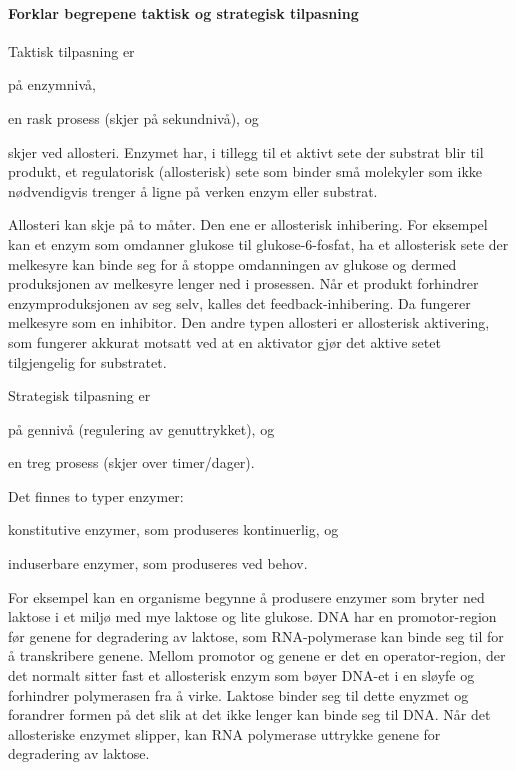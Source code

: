 \paragraph{Forklar begrepene taktisk og strategisk tilpasning} Taktisk tilpasning er 
\begin{inparaenum}[(i)]
	\item på enzymnivå,
	\item en rask prosess (skjer på sekundnivå), og
	\item skjer ved allosteri. Enzymet har, i tillegg til et aktivt sete der substrat blir til produkt, et regulatorisk (allosterisk) sete som binder små molekyler som ikke nødvendigvis trenger å ligne på verken enzym eller substrat.
\end{inparaenum}
Allosteri kan skje på to måter. Den ene er allosterisk inhibering. For eksempel kan et enzym som omdanner glukose til glukose-6-fosfat, ha et allosterisk sete der melkesyre kan binde seg for å stoppe omdanningen av glukose og dermed produksjonen av melkesyre lenger ned i prosessen. Når et produkt forhindrer enzymproduksjonen av seg selv, kalles det feedback-inhibering. Da fungerer melkesyre som en inhibitor. Den andre typen allosteri er allosterisk aktivering, som fungerer akkurat motsatt ved at en aktivator gjør det aktive setet tilgjengelig for substratet.

Strategisk tilpasning er
\begin{inparaenum}[(i)]
	\item på gennivå (regulering av genuttrykket), og
	\item en treg prosess (skjer over timer/dager).
\end{inparaenum}
Det finnes to typer enzymer: 
\begin{inparaenum}[(i)]
	\item konstitutive enzymer, som produseres kontinuerlig, og 
	\item induserbare enzymer, som produseres ved behov.
\end{inparaenum}
For eksempel kan en organisme begynne å produsere enzymer som bryter ned laktose i et miljø med mye laktose og lite glukose. DNA har en promotor-region før genene for degradering av laktose, som RNA-polymerase kan binde seg til for å transkribere genene. Mellom promotor og genene er det en operator-region, der det normalt sitter fast et allosterisk enzym som bøyer DNA-et i en sløyfe og forhindrer polymerasen fra å virke. Laktose binder seg til dette enyzmet og forandrer formen på det slik at det ikke lenger kan binde seg til DNA. Når det allosteriske enzymet slipper, kan RNA polymerase uttrykke genene for degradering av laktose.

